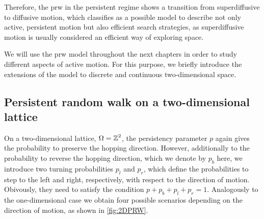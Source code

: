 Therefore, the \ac{prw} in the persistent regime shows a transition from superdiffusive to diffusive motion, which classifies as a possible model to describe not only active, persistent motion but also efficient search strategies, as superdiffusive motion is usually considered an efficient way of exploring space.

We will use the \ac{prw} model throughout the next chapters in order to study different aspects of active motion. For this purpose, we briefly introduce the extensions of the model to discrete and continuous two-dimensional space.

\subsection{Persistent random walk on a two-dimensional lattice} \label{ssec:2d-lattice}
On a two-dimensional lattice, \ie $\Omega = \operatorname{\mathbb{Z}}^2$, the persistency parameter $p$ again gives the probability to preserve the hopping direction. However, additionally to the probability to reverse the hopping direction, which we denote by $p_b$ here, we introduce two turning probabilities $p_l$ and $p_r$, which define the probabilities to step to the left and right, respectively, with respect to the direction of motion. Obivously, they need to satisfy the condition $p + p_b + p_l + p_r = 1$. Analogously to the one-dimensional case we obtain four possible scenarios depending on the direction of motion, as shown in \autoref{fig:2DPRW}.

